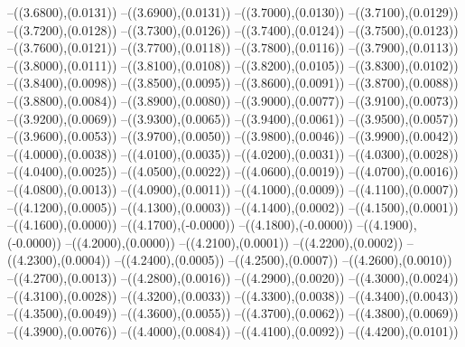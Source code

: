 {	--({\sx*(3.6800)},{\sy*(0.0131)})
	--({\sx*(3.6900)},{\sy*(0.0131)})
	--({\sx*(3.7000)},{\sy*(0.0130)})
	--({\sx*(3.7100)},{\sy*(0.0129)})
	--({\sx*(3.7200)},{\sy*(0.0128)})
	--({\sx*(3.7300)},{\sy*(0.0126)})
	--({\sx*(3.7400)},{\sy*(0.0124)})
	--({\sx*(3.7500)},{\sy*(0.0123)})
	--({\sx*(3.7600)},{\sy*(0.0121)})
	--({\sx*(3.7700)},{\sy*(0.0118)})
	--({\sx*(3.7800)},{\sy*(0.0116)})
	--({\sx*(3.7900)},{\sy*(0.0113)})
	--({\sx*(3.8000)},{\sy*(0.0111)})
	--({\sx*(3.8100)},{\sy*(0.0108)})
	--({\sx*(3.8200)},{\sy*(0.0105)})
	--({\sx*(3.8300)},{\sy*(0.0102)})
	--({\sx*(3.8400)},{\sy*(0.0098)})
	--({\sx*(3.8500)},{\sy*(0.0095)})
	--({\sx*(3.8600)},{\sy*(0.0091)})
	--({\sx*(3.8700)},{\sy*(0.0088)})
	--({\sx*(3.8800)},{\sy*(0.0084)})
	--({\sx*(3.8900)},{\sy*(0.0080)})
	--({\sx*(3.9000)},{\sy*(0.0077)})
	--({\sx*(3.9100)},{\sy*(0.0073)})
	--({\sx*(3.9200)},{\sy*(0.0069)})
	--({\sx*(3.9300)},{\sy*(0.0065)})
	--({\sx*(3.9400)},{\sy*(0.0061)})
	--({\sx*(3.9500)},{\sy*(0.0057)})
	--({\sx*(3.9600)},{\sy*(0.0053)})
	--({\sx*(3.9700)},{\sy*(0.0050)})
	--({\sx*(3.9800)},{\sy*(0.0046)})
	--({\sx*(3.9900)},{\sy*(0.0042)})
	--({\sx*(4.0000)},{\sy*(0.0038)})
	--({\sx*(4.0100)},{\sy*(0.0035)})
	--({\sx*(4.0200)},{\sy*(0.0031)})
	--({\sx*(4.0300)},{\sy*(0.0028)})
	--({\sx*(4.0400)},{\sy*(0.0025)})
	--({\sx*(4.0500)},{\sy*(0.0022)})
	--({\sx*(4.0600)},{\sy*(0.0019)})
	--({\sx*(4.0700)},{\sy*(0.0016)})
	--({\sx*(4.0800)},{\sy*(0.0013)})
	--({\sx*(4.0900)},{\sy*(0.0011)})
	--({\sx*(4.1000)},{\sy*(0.0009)})
	--({\sx*(4.1100)},{\sy*(0.0007)})
	--({\sx*(4.1200)},{\sy*(0.0005)})
	--({\sx*(4.1300)},{\sy*(0.0003)})
	--({\sx*(4.1400)},{\sy*(0.0002)})
	--({\sx*(4.1500)},{\sy*(0.0001)})
	--({\sx*(4.1600)},{\sy*(0.0000)})
	--({\sx*(4.1700)},{\sy*(-0.0000)})
	--({\sx*(4.1800)},{\sy*(-0.0000)})
	--({\sx*(4.1900)},{\sy*(-0.0000)})
	--({\sx*(4.2000)},{\sy*(0.0000)})
	--({\sx*(4.2100)},{\sy*(0.0001)})
	--({\sx*(4.2200)},{\sy*(0.0002)})
	--({\sx*(4.2300)},{\sy*(0.0004)})
	--({\sx*(4.2400)},{\sy*(0.0005)})
	--({\sx*(4.2500)},{\sy*(0.0007)})
	--({\sx*(4.2600)},{\sy*(0.0010)})
	--({\sx*(4.2700)},{\sy*(0.0013)})
	--({\sx*(4.2800)},{\sy*(0.0016)})
	--({\sx*(4.2900)},{\sy*(0.0020)})
	--({\sx*(4.3000)},{\sy*(0.0024)})
	--({\sx*(4.3100)},{\sy*(0.0028)})
	--({\sx*(4.3200)},{\sy*(0.0033)})
	--({\sx*(4.3300)},{\sy*(0.0038)})
	--({\sx*(4.3400)},{\sy*(0.0043)})
	--({\sx*(4.3500)},{\sy*(0.0049)})
	--({\sx*(4.3600)},{\sy*(0.0055)})
	--({\sx*(4.3700)},{\sy*(0.0062)})
	--({\sx*(4.3800)},{\sy*(0.0069)})
	--({\sx*(4.3900)},{\sy*(0.0076)})
	--({\sx*(4.4000)},{\sy*(0.0084)})
	--({\sx*(4.4100)},{\sy*(0.0092)})
	--({\sx*(4.4200)},{\sy*(0.0101)})
}
